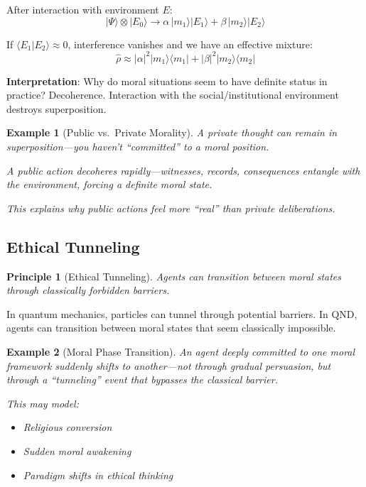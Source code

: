 \documentclass[12pt]{article}
\newtheorem{principle}{Principle}
\newtheorem{example}{Example}[section]
\begin{document}
After interaction with environment $E$:
\begin{equation}
    |\Psi\rangle \otimes |E_0\rangle \to \alpha \,|m_1\rangle |E_1\rangle + \beta \,|m_2\rangle |E_2\rangle
\end{equation}

If $\langle E_1 | E_2 \rangle \approx 0$, interference vanishes and we have an effective mixture:
\begin{equation}
    \hat{\rho} \approx |\alpha|^2 |m_1\rangle \langle m_1| + |\beta|^2 |m_2\rangle \langle m_2|
\end{equation}

\textbf{Interpretation}: Why do moral situations seem to have definite status in practice? Decoherence. Interaction with the social/institutional environment destroys superposition.

\begin{example}[Public vs.\ Private Morality]
A private thought can remain in superposition---you haven't ``committed'' to a moral position.

A public action decoheres rapidly---witnesses, records, consequences entangle with the environment, forcing a definite moral state.

This explains why public actions feel more ``real'' than private deliberations.
\end{example}

\subsection{Ethical Tunneling}

\begin{principle}[Ethical Tunneling]
\emph{Agents can transition between moral states through classically forbidden barriers.}
\end{principle}

In quantum mechanics, particles can tunnel through potential barriers. In QND, agents can transition between moral states that seem classically impossible.

\begin{example}[Moral Phase Transition]
An agent deeply committed to one moral framework suddenly shifts to another---not through gradual persuasion, but through a ``tunneling'' event that bypasses the classical barrier.

This may model:
\begin{itemize}
    \item Religious conversion
    \item Sudden moral awakening
    \item Paradigm shifts in ethical thinking
\end{itemize}
\end{example}
\end{document}
